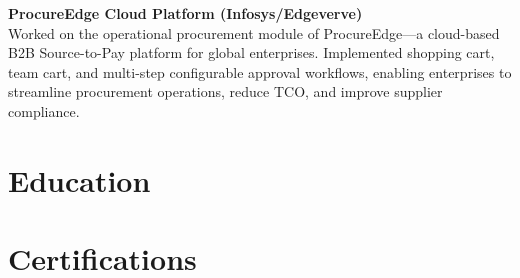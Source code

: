 \documentclass[a4paper,11pt]{article}
\begin{document}
\vspace{6pt}
\textbf{ProcureEdge Cloud Platform (Infosys/Edgeverve)} \\
Worked on the operational procurement module of ProcureEdge---a cloud-based B2B Source-to-Pay platform for global enterprises. Implemented shopping cart, team cart, and multi-step configurable approval workflows, enabling enterprises to streamline procurement operations, reduce TCO, and improve supplier compliance.

\section{Education}

\section{Certifications}
\end{document}
